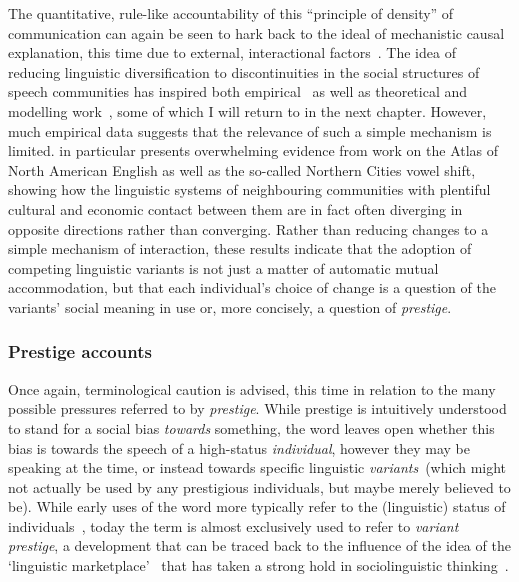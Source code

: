 The quantitative, rule-like accountability of this ``principle of density'' of communication can again be seen to hark back to the ideal of mechanistic causal explanation, this time due to external, interactional factors~\citep[p.19]{Labov2001}. The idea of reducing linguistic diversification to discontinuities in the social structures of speech communities has inspired both empirical~\citep{Milroy1985,Herold1997,Trudgill2008} as well as theoretical and modelling work~\citep{Nettle1999,Silva2008,Gong2012,Blythe2012,Pierrehumbert2014}, some of which I will return to in the next chapter.
However, much empirical data suggests that the relevance of such a simple mechanism is limited.
\citet[ch.6-10]{Labov2010} in particular presents overwhelming evidence from work on the Atlas of North American English as well as the so-called Northern Cities vowel shift, showing how the linguistic systems of neighbouring communities with plentiful cultural and economic contact between them are in fact often diverging in opposite directions rather than converging. Rather than reducing changes to a simple mechanism of interaction, these results indicate that the adoption of competing linguistic variants is not just a matter of automatic mutual accommodation, but that each individual's choice of change is a question of the variants' social meaning in use or, more concisely, a question of \emph{prestige}.


\subsubsection{Prestige accounts}
\label{sec:prestige}

Once again, terminological caution is advised, this time in relation to the many possible pressures referred to by \emph{prestige}. While prestige is intuitively understood to stand for a social bias \emph{towards} something, the word leaves open whether this bias is towards the speech of a high-status \emph{individual}, however they may be speaking at the time, or instead towards specific linguistic \emph{variants}~(which might not actually be used by any prestigious individuals, but maybe merely believed to be). While early uses of the word more typically refer to the (linguistic) status of individuals~\citep{Tarde1903,Fries1949}, today the term is almost exclusively used to refer to \emph{variant prestige}, a development that can be traced back to the influence of the idea of the `linguistic marketplace'~\citep{Bourdieu1977} that has taken a strong hold in sociolinguistic thinking~\citep{LePage1985,Cedergren1987,Tagliamonte2015}.

